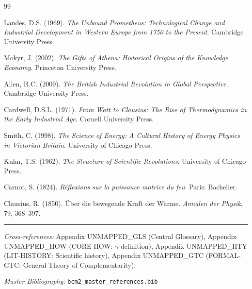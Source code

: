 \begin{thebibliography}{99}

 Landes, D.S. (1969). \textit{The Unbound Prometheus: Technological Change and Industrial Development in Western Europe from 1750 to the Present}. Cambridge University Press.

 Mokyr, J. (2002). \textit{The Gifts of Athena: Historical Origins of the Knowledge Economy}. Princeton University Press.

 Allen, R.C. (2009). \textit{The British Industrial Revolution in Global Perspective}. Cambridge University Press.

 Cardwell, D.S.L. (1971). \textit{From Watt to Clausius: The Rise of Thermodynamics in the Early Industrial Age}. Cornell University Press.

 Smith, C. (1998). \textit{The Science of Energy: A Cultural History of Energy Physics in Victorian Britain}. University of Chicago Press.

 Kuhn, T.S. (1962). \textit{The Structure of Scientific Revolutions}. University of Chicago Press.

 Carnot, S. (1824). \textit{Réflexions sur la puissance motrice du feu}. Paris: Bachelier.

 Clausius, R. (1850). Über die bewegende Kraft der Wärme. \textit{Annalen der Physik}, 79, 368--397.

\end{thebibliography}

\nocite{bcm_master}



\vspace{1em}
\hrule
\vspace{0.5em}

\noindent\textit{Cross-references:}
Appendix UNMAPPED_GLS (Central Glossary),
Appendix UNMAPPED_HOW (CORE-HOW: $\gamma$ definition),
Appendix UNMAPPED_HTY (LIT-HISTORY: Scientific history),
Appendix UNMAPPED_GTC (FORMAL-GTC: General Theory of Complementarity).

\noindent\textit{Master Bibliography:} \texttt{bcm2\_master\_references.bib}

